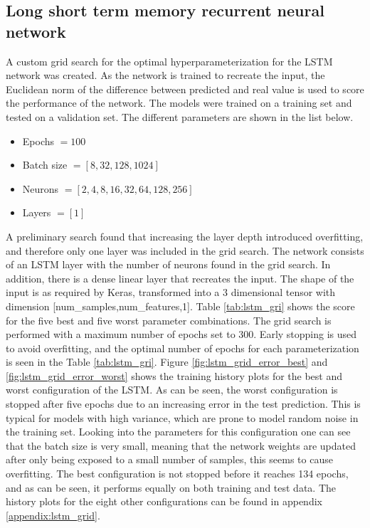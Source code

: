             \subsection{Long short term memory recurrent neural network}
                A custom grid search for the optimal hyperparameterization for the LSTM network was created. As the network is trained to recreate the input, the Euclidean norm of the difference between predicted and real value is used to score the performance of the network. The models were trained on a training set and tested on a validation set. The different parameters are shown in the list below.  
                \begin{itemize}
                    \item Epochs $= 100$
                    \item Batch size $=[8,32,128,1024]$
                    \item Neurons $= [2,4,8,16,32,64,128,256]$
                    \item Layers $= [1]$
                \end{itemize}
                A preliminary search found that increasing the layer depth introduced overfitting, and therefore only one layer was included in the grid search. The network consists of an LSTM layer with the number of neurons found in the grid search. In addition, there is a dense linear layer that recreates the input. The shape of the input is as required by Keras, transformed into a 3 dimensional tensor with dimension [num\_samples,num\_features,1]. Table \ref{tab:lstm_gri} shows the score for the five best and five worst parameter combinations. The grid search is performed with a maximum number of epochs set to $300$. Early stopping is used to avoid overfitting, and the optimal number of epochs for each parameterization is seen in the Table \ref{tab:lstm_gri}. Figure \ref{fig:lstm_grid_error_best} and \ref{fig:lstm_grid_error_worst} shows the training history plots for the best and worst configuration of the LSTM. As can be seen, the worst configuration is stopped after five epochs due to an increasing error in the test prediction. This is typical for models with high variance, which are prone to model random noise in the training set. Looking into the parameters for this configuration one can see that the batch size is very small, meaning that the network weights are updated after only being exposed to a small number of samples, this seems to cause overfitting. The best configuration is not stopped before it reaches 134 epochs, and as can be seen, it performs equally on both training and test data. The history plots for the eight other configurations can be found in appendix \ref{appendix:lstm_grid}. 
                
